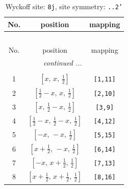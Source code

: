 \documentclass[fleqn,8pt]{jsarticle}
\begin{document}
\begin{longtable}{ccc}
\caption{Wyckoff site: {\tt 8j}, site symmetry: {\tt ..2'}}
 \\
 \hline \hline
No. & position & mapping \\ \hline \endfirsthead

\multicolumn{2}{l}{\tablename\ \thetable{}} \\
 \hline \hline
No. & position & mapping \\ \hline \endhead

 \hline \hline
\multicolumn{2}{r}{\footnotesize\it continued ...} \\ \endfoot

 \hline \hline
\multicolumn{2}{r}{} \\ \endlastfoot

1 & $\left[ x,\, x,\, \frac{1}{2} \right]$ & {\tt [1,11]} \\ \hline
2 & $\left[ \frac{1}{2} - x,\, x,\, \frac{1}{2} \right]$ & {\tt [2,10]} \\ \hline
3 & $\left[ x,\, \frac{1}{2} - x,\, \frac{1}{2} \right]$ & {\tt [3,9]} \\ \hline
4 & $\left[ \frac{1}{2} - x,\, \frac{1}{2} - x,\, \frac{1}{2} \right]$ & {\tt [4,12]} \\ \hline
5 & $\left[ - x,\, - x,\, \frac{1}{2} \right]$ & {\tt [5,15]} \\ \hline
6 & $\left[ x + \frac{1}{2},\, - x,\, \frac{1}{2} \right]$ & {\tt [6,14]} \\ \hline
7 & $\left[ - x,\, x + \frac{1}{2},\, \frac{1}{2} \right]$ & {\tt [7,13]} \\ \hline
8 & $\left[ x + \frac{1}{2},\, x + \frac{1}{2},\, \frac{1}{2} \right]$ & {\tt [8,16]} \\
\end{longtable}
\renewcommand{\arraystretch}{1.2}
\end{document}
